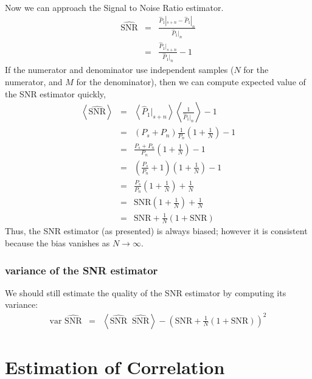 Now we can approach the Signal to Noise Ratio estimator.
\begin{eqnarray}
\widehat{\textrm{SNR}} &=& \frac{\hat{P}_1|_{s+n} - \hat{P}_1|_n}{\hat{P}_1|_n} \\
&=& \frac{\hat{P}_1|_{s+n}}{\hat{P}_1|_n} - 1
\end{eqnarray}
If the numerator and denominator use independent samples ($N$ for the
numerator, and $M$ for the denominator), then we can compute expected
value of the SNR estimator quickly,
\begin{eqnarray}
\left\langle \widehat{\textrm{SNR}} \right\rangle &=& \left\langle
  \hat{P}_1|_{s+n} \right\rangle \left\langle
  \frac{1}{\hat{P}_1|_n}\right\rangle - 1 \\
&=& (P_s + P_n) \frac{1}{P_n}(1 + \frac{1}{N}) - 1 \\
&=& \frac{P_s + P_n}{P_n}\left( 1 + \frac{1}{N}\right) - 1 \\
&=& \left(\frac{P_s}{P_n} + 1 \right)\left(1 + \frac{1}{N}\right) - 1
\\
&=& \frac{P_s}{P_n}\left(1 + \frac{1}{N}\right) +\frac{1}{N} \\
&=& \textrm{SNR}\left(1 + \frac{1}{N}\right) +\frac{1}{N} \\
&=& \textrm{SNR} + \frac{1}{N}(1 + \textrm{SNR}) 
\end{eqnarray}
Thus, the SNR estimator (as presented) is always biased; however it is
consistent because the bias vanishes as $N\rightarrow \infty$.

\subsubsection{variance of the SNR estimator}

We should still estimate the quality of the SNR estimator by computing
its variance:
\begin{eqnarray}
\textrm{var } \widehat{\textrm{SNR}} &=& \left\langle
  \widehat{\textrm{SNR}} \;\;\widehat{\textrm{SNR}}\right\rangle -\left (\textrm{SNR} + \frac{1}{N}(1 + \textrm{SNR})\right)^2
\end{eqnarray}

\section{Estimation of Correlation}

